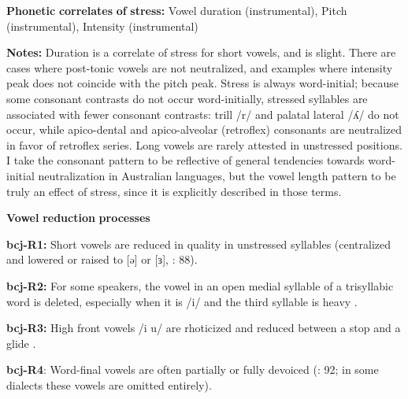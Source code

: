 \begin{styleBody}
\textbf{Phonetic} \textbf{correlates} \textbf{of} \textbf{stress:} Vowel duration (instrumental), Pitch (instrumental), Intensity (instrumental)
\end{styleBody}

\begin{styleBody}
\textbf{Notes:} Duration is a correlate of stress for short vowels, and is slight. There are cases where post-tonic vowels are not neutralized, and examples where intensity peak does not coincide with the pitch peak. Stress is always word-initial; because some consonant contrasts do not occur word-initially, stressed syllables are associated with fewer consonant contrasts: trill /r/ and palatal lateral /ʎ/ do not occur, while apico-dental and apico-alveolar (retroflex) consonants are neutralized in favor of retroflex series. Long vowels are rarely attested in unstressed positions. I take the consonant pattern to be reflective of general tendencies towards word-initial neutralization in Australian languages, but the vowel length pattern to be truly an effect of stress, since it is explicitly described in those terms.
\end{styleBody}

\begin{styleBody}
\textbf{Vowel} \textbf{reduction} \textbf{processes}
\end{styleBody}

\begin{styleBody}
\textbf{bcj-R1:} Short vowels are reduced in quality in unstressed syllables (centralized and lowered or raised to [ə] or [ɜ], \citealt{Bowern2012}: 88).
\end{styleBody}

\begin{styleBody}
\textbf{bcj-R2:} For some speakers, the vowel in an open medial syllable of a trisyllabic word is deleted, especially when it is /i/ and the third syllable is heavy \citep[91]{Bowern2012}.
\end{styleBody}

\begin{styleBody}
\textbf{bcj-R3:} High front vowels /i u/ are rhoticized and reduced between a stop and a glide \citep[91]{Bowern2012}.
\end{styleBody}

\begin{styleBody}
\textbf{bcj-R4}: Word-final vowels are often partially or fully devoiced (\citealt{Bowern2012}: 92; in some dialects these vowels are omitted entirely).
\end{styleBody}

